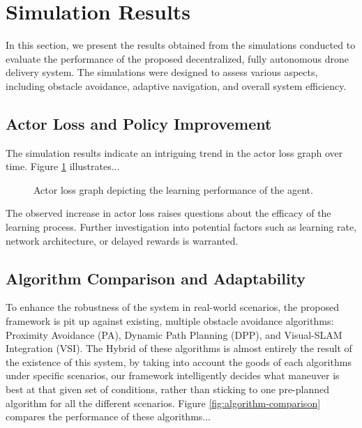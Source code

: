 \documentclass[preprint,12pt]{elsarticle}
\begin{document}
\section{Simulation Results}
\label{sec:simulation-results}

In this section, we present the results obtained from the simulations conducted to evaluate the performance of the proposed decentralized, fully autonomous drone delivery system. The simulations were designed to assess various aspects, including obstacle avoidance, adaptive navigation, and overall system efficiency.

\subsection{Actor Loss and Policy Improvement}
The simulation results indicate an intriguing trend in the actor loss graph over time. Figure \ref{fig:actor-loss} illustrates...

\begin{figure}[htbp]
  \centering
  \caption{Actor loss graph depicting the learning performance of the agent.}
  \label{fig:actor-loss}
\end{figure}

The observed increase in actor loss raises questions about the efficacy of the learning process. Further investigation into potential factors such as learning rate, network architecture, or delayed rewards is warranted.

\subsection{Algorithm Comparison and Adaptability}
To enhance the robustness of the system in real-world scenarios, the proposed framework is pit up against existing, multiple obstacle avoidance algorithms: Proximity Avoidance (PA), Dynamic Path Planning (DPP), and Visual-SLAM Integration (VSI). The Hybrid of these algorithms is almost entirely the result of the existence of this system, by taking into account the goods of each algorithms under specific scenarios, our framework intelligently decides what maneuver is best at that given set of conditions, rather than sticking to one pre-planned algorithm for all the different scenarios. Figure \ref{fig:algorithm-comparison} compares the performance of these algorithms...
\end{document}
